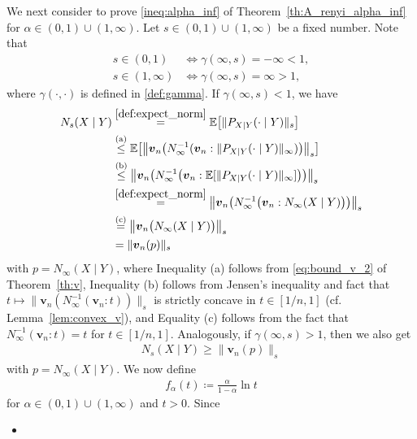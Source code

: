 \documentclass[conference, draftcls, onecolumn]{IEEEtran}
\theoremstyle{plain}
\newcommand{\bvec}[1]{\boldsymbol{#1}}
\newcommand{\lemref}[1]{Lemma~\ref{#1}}
\newcommand{\thref}[1]{Theorem~\ref{#1}}
\begin{document}
\begin{IEEEproof}[Proof of \thref{th:A_renyi_alpha_inf}]
We next consider to prove \eqref{ineq:alpha_inf} of \thref{th:A_renyi_alpha_inf} for $\alpha \in (0, 1) \cup (1, \infty)$.
Let $s \in (0, 1) \cup (1, \infty)$ be a fixed number.
Note that
\begin{align}
s \in (0, 1)
& \iff
\gamma( \infty, s ) = - \infty < 1 ,
\\
s \in (1, \infty)
& \iff
\gamma( \infty, s ) = \infty > 1 ,
\end{align}
where $\gamma(\cdot, \cdot)$ is defined in
\eqref{def:gamma}.
If $\gamma(\infty, s) < 1$, we have
\begin{align}
N_{s}(X \mid Y)
& \overset{\eqref{def:expect_norm}}{=}
\mathbb{E}\big[ \| P_{X|Y}(\cdot \mid Y) \|_{s} \big]
\\
& \overset{\text{(a)}}{\le}
\mathbb{E}\big[ \big\| \bvec{v}_{n}\big( N_{\infty}^{-1}(\bvec{v}_{n} : \| P_{X|Y}(\cdot \mid Y) \|_{\infty} ) \big) \big\|_{s} \big]
\\
& \overset{\text{(b)}}{\le}
\big\| \bvec{v}_{n}\big( N_{\infty}^{-1}\big(\bvec{v}_{n} : \mathbb{E}[ \| P_{X|Y}(\cdot \mid Y) \|_{\infty} ] \big) \big) \big\|_{s}
\\
& \overset{\eqref{def:expect_norm}}{=}
\big\| \bvec{v}_{n}\big( N_{\infty}^{-1}\big(\bvec{v}_{n} : N_{\infty}(X \mid Y) \big) \big) \big\|_{s}
\\
& \overset{\text{(c)}}{=}
\big\| \bvec{v}_{n}\big( N_{\infty}(X \mid Y) \big) \big\|_{s}
\\
& =
\| \bvec{v}_{n}( p ) \|_{s}
\label{eq:A_renyi_inf_proof1}
\end{align}
with $p = N_{\infty}(X \mid Y)$, where Inequality (a) follows from \eqref{eq:bound_v_2} of \thref{th:v}, Inequality (b) follows from Jensen's inequality and fact that $t \mapsto \| \bvec{v}_{n}( N_{\infty}^{-1}( \bvec{v}_{n} : t ) ) \|_{s}$ is strictly concave in $t \in [1/n, 1]$ (cf. \lemref{lem:convex_v}), and Equality (c) follows from the fact that $N_{\infty}^{-1}( \bvec{v}_{n} : t ) = t$ for $t \in [1/n, 1]$.
Analogously, if $\gamma(\infty, s) > 1$, then we also get
\begin{align}
N_{s}(X \mid Y)
\ge
\| \bvec{v}_{n}( p ) \|_{s}
\label{eq:A_renyi_inf_proof2}
\end{align}
with $p = N_{\infty}(X \mid Y)$.
We now define
\begin{align}
f_{\alpha}( t )
\coloneqq
\frac{ \alpha }{ 1 - \alpha } \ln t
\end{align}
for $\alpha \in (0, 1) \cup (1, \infty)$ and $t > 0$.
Since
\begin{itemize}
\item

\end{itemize}
\end{IEEEproof}
\end{document}
